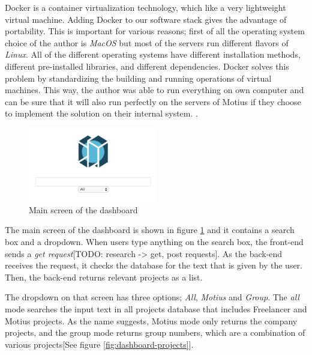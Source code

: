 Docker is a container virtualization technology, which like a very lightweight virtual machine. Adding Docker to our software stack gives the advantage of portability. This is important for various reasons; first of all the operating system choice of the author is \textit{MacOS} but most of the servers run different flavors of \textit{Linux}. All of the different operating systems have different installation methods, different pre-installed libraries, and different dependencies. Docker solves this problem by standardizing the building and running operations of virtual machines. This way, the author was able to run everything on own computer and can be sure that it will also run perfectly on the servers of Motius if they choose to implement the solution on their internal system. \cite{anderson2015docker}.


 \begin{figure}[!ht]
	\centering
	\includegraphics[width=0.5\textwidth]{figures/DashboardMain.png}
	\caption{Main screen of the dashboard}
	\label{fig:dashboard-main}
\end{figure}


The main screen of the dashboard is shown in figure \ref{fig:dashboard-main} and it contains a search box and a dropdown. When users type anything on the search box, the front-end sends a \textit{get request}[TODO: research -> get, post requests]. As the back-end receives the request, it checks the database for the text that is given by the user. Then, the back-end returns relevant projects as a list. 


The dropdown on that screen has three options; \textit{All},  \textit{Motius} and  \textit{Group}. The \textit{all} mode searches the input text in all projects database that includes Freelancer and Motius projects. As the name suggests, Motius mode only returns the company projects, and the group mode returns group numbers, which are a combination of various projects[See figure \ref{fig:dashboard-projects}]. 

